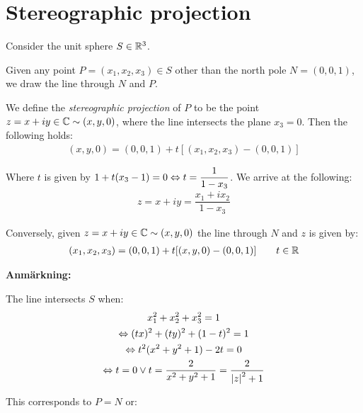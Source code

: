 \section{Stereographic projection}\par
\noindent Consider the unit sphere $S\in\mathbb{R}^3$.\par
\noindent Given any point $P = (x_1,x_2,x_3)\in S$ other than the north pole $N = (0,0,1)$, we draw the line through $N$ and $P$.\par
\noindent We define the \textit{stereographic projection} of $P$ to be the point $z = x+iy\in\mathbb{C}\sim (x,y,0)$, where the line intersects the plane $x_3 = 0$. Then the following holds:
\begin{equation*}
  \begin{gathered}
    (x,y,0) = (0,0,1)+t[(x_1,x_2,x_3)-(0,0,1)]
  \end{gathered}
\end{equation*}\par
\noindent Where $t$ is given by $1+t(x_3-1)=0\Leftrightarrow t= \dfrac{1}{1-x_3}$. We arrive at the following:
\begin{equation*}
  \begin{gathered}
    z = x+iy = \dfrac{x_1+ix_2}{1-x_3}
  \end{gathered}
\end{equation*}
\par\bigskip
\noindent Conversely, given $z = x+iy\in\mathbb{C}\sim (x,y,0)$ the line through $N$ and $z$ is given by:
\begin{equation*}
  \begin{gathered}
    (x_1,x_2,x_3) = (0,0,1)+t[(x,y,0)-(0,0,1)]\qquad t\in\mathbb{R}
  \end{gathered}
\end{equation*}
\par\bigskip
\noindent\textbf{Anmärkning:}\par
\noindent The line intersects $S$ when:
\begin{equation*}
  \begin{gathered}
    x_1^2+x_2^2+x_3^2 = 1\\
    \Leftrightarrow (tx)^2+(ty)^2+(1-t)^2 = 1\\
    \Leftrightarrow t^2(x^2+y^2+1)-2t=0\\
    \Leftrightarrow t=0\vee t=\dfrac{2}{x^2+y^2+1} = \dfrac{2}{\left|z\right|^2+1}
  \end{gathered}
\end{equation*}
\par\bigskip
\noindent This corresponds to $P = N$ or:
